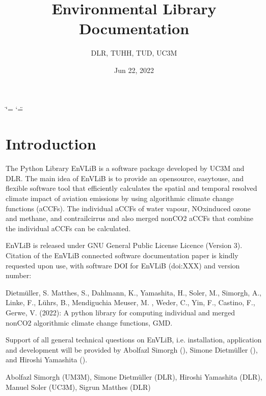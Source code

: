\documentclass[a4paper,11pt,english]{sphinxmanual}
\title{Environmental Library Documentation}
\date{Jun 22, 2022}
\author{DLR, TUHH, TUD, UC3M}
\begin{document}
\ifdefined\shorthandoff
  \ifnum\catcode`\=\string=\active\shorthandoff{=}\fi
  \ifnum\catcode`\"=\active{}\fi
\fi

\pagestyle{empty}
\sphinxmaketitle
\pagestyle{plain}
\sphinxtableofcontents
\pagestyle{normal}
\label{\detokenize{index::doc}}



\chapter{Introduction}
\label{\detokenize{index:introduction}}
\sphinxAtStartPar
{} The Python Library EnVLiB is a software package developed by UC3M and DLR. The main idea of EnVLiB is to provide an open\sphinxhyphen{}source, easy\sphinxhyphen{}to\sphinxhyphen{}use, and flexible software tool that efficiently calculates the spatial and temporal resolved climate impact of aviation emissions by using algorithmic climate change functions (aCCFs). The individual aCCFs of water vapour, NOx\sphinxhyphen{}induced ozone and methane, and contrail\sphinxhyphen{}cirrus and also merged non\sphinxhyphen{}CO2 aCCFs that combine the individual aCCFs can be calculated.

\sphinxAtStartPar
{} EnVLiB is released under GNU General Public License Licence (Version 3). Citation of the EnVLiB connected software documentation paper is kindly requested upon use, with software DOI for EnVLiB (doi:XXX) and version number:

\sphinxAtStartPar
{} Dietmüller, S. Matthes, S., Dahlmann, K., Yamashita, H., Soler, M., Simorgh, A., Linke, F., Lührs, B., Mendiguchia Meuser, M. , Weder, C., Yin, F., Castino, F., Gerwe, V. (2022): A python library for computing individual and merged non\sphinxhyphen{}CO2 algorithmic climate change functions, GMD.

\sphinxAtStartPar
{} Support of all general technical questions on EnVLiB, i.e. installation, application and development will be provided by Abolfazl Simorgh (), Simone Dietmüller (), and Hiroshi Yamashita ().

\sphinxAtStartPar
{} Abolfazl Simorgh (UM3M), Simone Dietmüller (DLR), Hiroshi Yamashita (DLR), Manuel Soler (UC3M), Sigrun Matthes (DLR)
\end{document}
